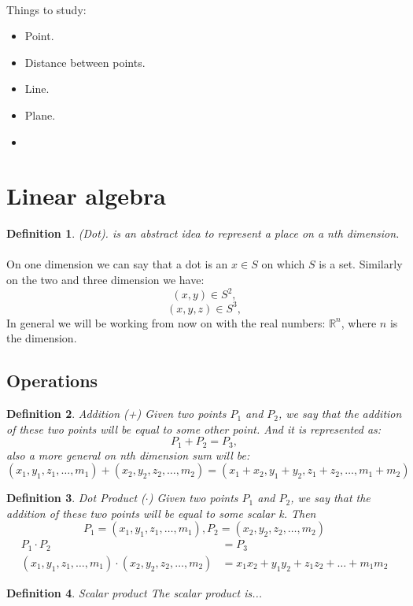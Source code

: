 \documentclass{article}
\newtheorem{definition}{Definition}[section]
\begin{document}
\paragraph{}Things to study:
\begin{itemize}
    \item Point.
    \item Distance between points.
    \item Line.
    \item Plane.
    \item 
\end{itemize}
\section{Linear algebra}
\begin{definition}{(Dot).}
is an abstract idea to represent a place on a nth dimension.
\end{definition}
\paragraph{} On one dimension we can say that a dot is an $x \in S$ on which $S$ is a set. Similarly on the two and three dimension we have:
$$(x,y) \in S^{2},$$
$$(x,y,z) \in S^{3},$$
In general we will be working from now on with the real numbers: $\mathbb{R}^n$, where $n$ is the dimension.
\subsection{Operations}
\begin{definition}{Addition (+)}
Given two points $P_1$ and $P_2$, we say that the addition of these two points will be equal to some other point. And it is represented as:
$$P_1 + P_2 = P_3,$$
also a more general on nth dimension sum will be:
$$(x_1, y_1, z_1, \dots, m_1) + (x_2, y_2, z_2, \dots, m_2) = (x_1 + x_2, y_1 + y_2, z_1 + z_2, \dots, m_1 + m_2)$$
\end{definition}
\begin{definition}{Dot Product ($\cdot$)}
Given two points $P_1$ and $P_2$, we say that the addition of these two points will be equal to some scalar k. Then
$$P_1 = (x_1, y_1, z_1, \dots, m_1), P_2 = (x_2, y_2, z_2, \dots, m_2)$$
\begin{align*}
    P_1 \cdot P_2 &= P_3\\
    (x_1, y_1, z_1, \dots, m_1) \cdot (x_2, y_2, z_2, \dots, m_2) &=  x_1 x_2 + y_1 y_2 + z_1 z_2 + \dots + m_1 m_2
\end{align*}
\end{definition}
\begin{definition}{Scalar product}
The scalar product is...
\end{definition}
\end{document}
